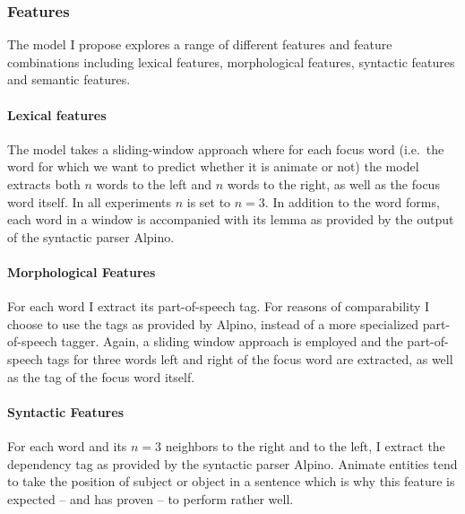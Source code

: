 \subsubsection{Features}\label{sec:animacy-features}
The model I propose explores a range of different features and feature combinations including lexical features, morphological features, syntactic features and semantic features.

\paragraph{Lexical features}
The model takes a sliding-window approach where for each focus word (i.e.\ the word for which we want to predict whether it is animate or not) the model extracts both $n$ words to the left and $n$ words to the right, as well as the focus word itself. In all experiments $n$ is set to $n=3$. In addition to the word forms, each word in a window is accompanied with its lemma as provided by the output of the syntactic parser Alpino.

\paragraph{Morphological Features}
For each word I extract its part-of-speech tag. For reasons of comparability I choose to use the tags as provided by Alpino, instead of a more specialized part-of-speech tagger. Again, a sliding window approach is employed and the part-of-speech tags for three words left and right of the focus word are extracted, as well as the tag of the focus word itself.

\paragraph{Syntactic Features}
For each word and its $n=3$ neighbors to the right and to the left, I extract the dependency tag as provided by the syntactic parser Alpino. Animate entities tend to take the position of subject or object in a sentence which is why this feature is expected -- and has proven\autocite{karsdorp:2012b} -- to perform rather well.

